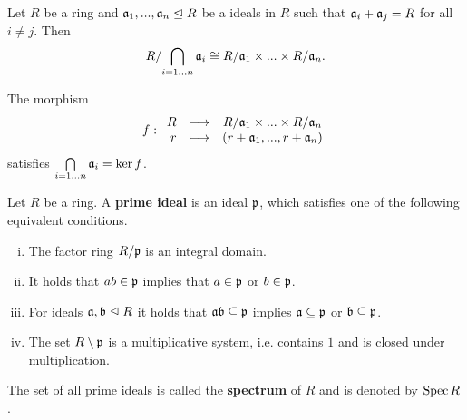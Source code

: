 	\begin{theorem}
		Let $R$ be a ring and $\mathfrak{a}_1, ..., \mathfrak{a}_n \trianglelefteq R$ be a ideals in $R$ such that $\mathfrak{a}_i + \mathfrak{a}_j = R$ for all $i \neq j$. Then
		\begin{equation*}
			R / {\bigcap \limits_{i=1...n} \mathfrak{a}_i} \cong R/\mathfrak{a}_1 \times ... \times R/\mathfrak{a}_n.
		\end{equation*}
	\end{theorem}
	\begin{sketch}
		The morphism
		\begin{equation*}
			f:
			\begin{array}{rrcl}
					R	&\longrightarrow	&R/\mathfrak{a}_1 \times ... \times R/\mathfrak{a}_n\\
					r	&\longmapsto 		&(r+\mathfrak{a}_1, ..., r + \mathfrak{a}_n)
			\end{array}
		\end{equation*}
		satisfies $\bigcap \limits_{i=1...n} \mathfrak{a}_i = \ker f$.
	\end{sketch}

	\begin{definition}
		Let $R$ be a ring. A \textbf{prime ideal} is an ideal $\mathfrak{p}$, which satisfies one of the following equivalent conditions.
		\begin{enumerate}[(i)]
			\item{
				The factor ring $R/\mathfrak{p}$ is an integral domain.
			}
			\item{
				It holds that $ab \in \mathfrak{p}$ implies that $a \in \mathfrak{p}$ or $b \in \mathfrak{p}$.
			}
			\item{
				For ideals $\mathfrak{a},\mathfrak{b} \trianglelefteq R$ it holds that $\mathfrak{a}\mathfrak{b} \subseteq \mathfrak{p}$ implies $\mathfrak{a} \subseteq \mathfrak{p}$ or $\mathfrak{b} \subseteq \mathfrak{p}$.
			}
			\item{
				The set $R \setminus \mathfrak{p}$ is a multiplicative system, i.e. contains $1$ and is closed under multiplication.
			}
		\end{enumerate}
		The set of all prime ideals is called the \textbf{spectrum} of $R$ and is denoted by $\operatorname{Spec} R$.
	\end{definition}

